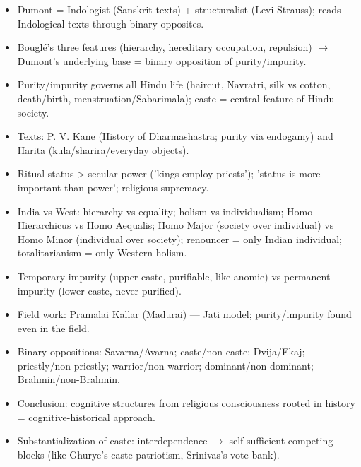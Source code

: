 \begin{QuickRevision}
\begin{itemize}
\item Dumont = Indologist (Sanskrit texts) + structuralist (Levi-Strauss); reads Indological texts through binary opposites.
\item Bouglé's three features (hierarchy, hereditary occupation, repulsion) $\rightarrow$ Dumont's underlying base = binary opposition of purity/impurity.
\item Purity/impurity governs all Hindu life (haircut, Navratri, silk vs cotton, death/birth, menstruation/Sabarimala); caste = central feature of Hindu society.
\item Texts: P. V. Kane (History of Dharmashastra; purity via endogamy) and Harita (kula/sharira/everyday objects).
\item Ritual status > secular power ('kings employ priests'); 'status is more important than power'; religious supremacy.
\item India vs West: hierarchy vs equality; holism vs individualism; Homo Hierarchicus vs Homo Aequalis; Homo Major (society over individual) vs Homo Minor (individual over society); renouncer = only Indian individual; totalitarianism = only Western holism.
\item Temporary impurity (upper caste, purifiable, like anomie) vs permanent impurity (lower caste, never purified).
\item Field work: Pramalai Kallar (Madurai) --- Jati model; purity/impurity found even in the field.
\item Binary oppositions: Savarna/Avarna; caste/non-caste; Dvija/Ekaj; priestly/non-priestly; warrior/non-warrior; dominant/non-dominant; Brahmin/non-Brahmin.
\item Conclusion: cognitive structures from religious consciousness rooted in history = cognitive-historical approach.
\item Substantialization of caste: interdependence $\rightarrow$ self-sufficient competing blocks (like Ghurye's caste patriotism, Srinivas's vote bank).
\end{itemize}
\end{QuickRevision}

